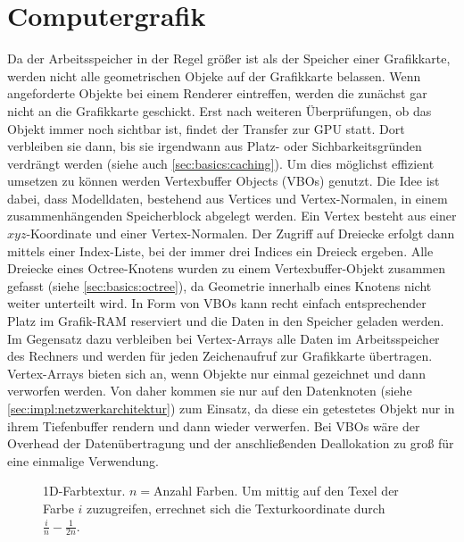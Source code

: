 \section{Computergrafik}
\label{sec:basics:computergrafik}
Da der Arbeitsspeicher in der Regel größer ist als der Speicher einer Grafikkarte, werden nicht alle geometrischen Objeke auf der Grafikkarte belassen. Wenn angeforderte Objekte bei einem Renderer eintreffen, werden die zunächst gar nicht an die Grafikkarte geschickt. Erst nach weiteren Überprüfungen, ob das Objekt immer noch sichtbar ist, findet der Transfer zur GPU statt. Dort verbleiben sie dann, bis sie irgendwann aus Platz- oder Sichbarkeitsgründen verdrängt werden (siehe auch \ref{sec:basics:caching}). Um dies möglichst effizient umsetzen zu können werden Vertexbuffer Objects  (VBOs) genutzt. Die Idee ist dabei, dass Modelldaten, bestehend aus Vertices und Vertex-Normalen, in einem zusammenhängenden Speicherblock abgelegt werden. Ein Vertex besteht aus einer $xyz$-Koordinate und einer Vertex-Normalen. Der Zugriff auf Dreiecke erfolgt dann mittels einer Index-Liste, bei der immer drei Indices ein Dreieck ergeben. Alle Dreiecke eines Octree-Knotens wurden zu einem Vertexbuffer-Objekt zusammen gefasst (siehe \ref{sec:basics:octree}), da Geometrie innerhalb eines Knotens nicht weiter unterteilt wird. In Form von VBOs kann recht einfach entsprechender Platz im Grafik-RAM reserviert und die Daten in den Speicher geladen werden.\\
Im Gegensatz dazu verbleiben bei Vertex-Arrays alle Daten im Arbeitsspeicher des Rechners und werden für jeden Zeichenaufruf zur Grafikkarte übertragen. Vertex-Arrays bieten sich an, wenn Objekte nur einmal gezeichnet und dann verworfen werden. Von daher kommen sie nur auf den Datenknoten (siehe \ref{sec:impl:netzwerkarchitektur}) zum Einsatz, da diese ein getestetes Objekt nur in ihrem Tiefenbuffer rendern und dann wieder verwerfen. Bei VBOs wäre der Overhead der Datenübertragung und der anschließenden Deallokation zu groß für eine einmalige Verwendung.
\begin{figure}
  \centering
  
  \caption{1D-Farbtextur. $n=$Anzahl Farben. Um mittig auf den Texel der Farbe $i$ zuzugreifen, errechnet sich die Texturkoordinate durch $\frac{i}{n}-\frac{1}{2n}$. }
  \label{fig:basics:1dtexture}
\end{figure}

